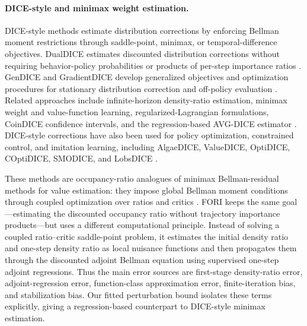 \documentclass{article}
\newcommand{\1}{\mathbf{1}}
\theoremstyle{plain}
\theoremstyle{definition}
\theoremstyle{remark}
\begin{document}
\paragraph{DICE-style and minimax weight estimation.}
DICE-style methods estimate distribution corrections by enforcing Bellman
moment restrictions through saddle-point, minimax, or temporal-difference
objectives. DualDICE estimates discounted distribution corrections without
requiring behavior-policy probabilities or products of per-step importance
ratios \citep{nachumEtAl2019DualDICE}. GenDICE and GradientDICE develop
generalized objectives and optimization procedures for stationary distribution
correction and off-policy evaluation
\citep{zhangEtAl2020GenDICE,zhangEtAl2020GradientDICE}. Related approaches
include infinite-horizon density-ratio estimation, minimax weight and
value-function learning, regularized-Lagrangian formulations, CoinDICE
confidence intervals, and the regression-based AVG-DICE estimator
\citep{liuEtAl2018InfiniteHorizonOPE,ueharaEtAl2020MWLMQL,
ueharaEtAl2021FiniteSampleMinimax,yangEtAl2020RegularizedLagrangianDICE,
daiEtAl2020CoinDICE,cheEtAl2025AVGDICE}. DICE-style corrections have also been
used for policy optimization, constrained control, and imitation learning,
including AlgaeDICE, ValueDICE, OptiDICE, COptiDICE, SMODICE, and LobsDICE
\citep{nachumEtAl2019AlgaeDICE,kostrikovEtAl2020ValueDICE,
leeEtAl2021OptiDICE,leeEtAl2022COptiDICE,maEtAl2022SMODICE,
kimEtAl2022LobsDICE}.

These methods are occupancy-ratio analogues of minimax Bellman-residual methods
for value estimation: they impose global Bellman moment conditions through
coupled optimization over ratios and critics
\citep{liuEtAl2018InfiniteHorizonOPE,nachumEtAl2019DualDICE,
ueharaEtAl2020MWLMQL,ueharaEtAl2021FiniteSampleMinimax}. \textsc{FORI} keeps
the same goal---estimating the discounted occupancy ratio without trajectory
importance products---but uses a different computational principle. Instead of
solving a coupled ratio--critic saddle-point problem, it estimates the initial
density ratio and one-step density ratio as local nuisance functions and then
propagates them through the discounted adjoint Bellman equation using supervised
one-step adjoint regressions. Thus the main error sources are first-stage
density-ratio error, adjoint-regression error, function-class approximation
error, finite-iteration bias, and stabilization bias. Our fitted perturbation
bound isolates these terms explicitly, giving a regression-based counterpart to
DICE-style minimax estimation.
\end{document}
